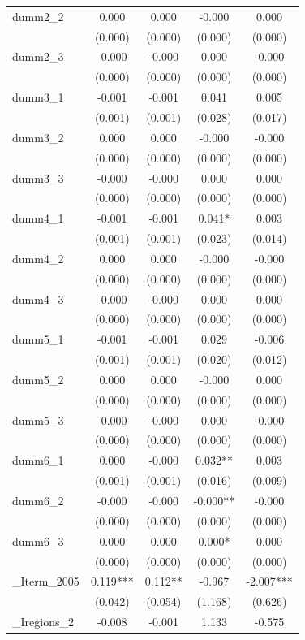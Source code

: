 \documentclass[]{article}
\begin{document}
\begin{tabular}{lcccc}
dumm2\_2 & 0.000 & 0.000 & -0.000 & 0.000 \\
 & (0.000) & (0.000) & (0.000) & (0.000) \\
dumm2\_3 & -0.000 & -0.000 & 0.000 & -0.000 \\
 & (0.000) & (0.000) & (0.000) & (0.000) \\
dumm3\_1 & -0.001 & -0.001 & 0.041 & 0.005 \\
 & (0.001) & (0.001) & (0.028) & (0.017) \\
dumm3\_2 & 0.000 & 0.000 & -0.000 & -0.000 \\
 & (0.000) & (0.000) & (0.000) & (0.000) \\
dumm3\_3 & -0.000 & -0.000 & 0.000 & 0.000 \\
 & (0.000) & (0.000) & (0.000) & (0.000) \\
dumm4\_1 & -0.001 & -0.001 & 0.041* & 0.003 \\
 & (0.001) & (0.001) & (0.023) & (0.014) \\
dumm4\_2 & 0.000 & 0.000 & -0.000 & -0.000 \\
 & (0.000) & (0.000) & (0.000) & (0.000) \\
dumm4\_3 & -0.000 & -0.000 & 0.000 & 0.000 \\
 & (0.000) & (0.000) & (0.000) & (0.000) \\
dumm5\_1 & -0.001 & -0.001 & 0.029 & -0.006 \\
 & (0.001) & (0.001) & (0.020) & (0.012) \\
dumm5\_2 & 0.000 & 0.000 & -0.000 & 0.000 \\
 & (0.000) & (0.000) & (0.000) & (0.000) \\
dumm5\_3 & -0.000 & -0.000 & 0.000 & -0.000 \\
 & (0.000) & (0.000) & (0.000) & (0.000) \\
dumm6\_1 & 0.000 & -0.000 & 0.032** & 0.003 \\
 & (0.001) & (0.001) & (0.016) & (0.009) \\
dumm6\_2 & -0.000 & -0.000 & -0.000** & -0.000 \\
 & (0.000) & (0.000) & (0.000) & (0.000) \\
dumm6\_3 & 0.000 & 0.000 & 0.000* & 0.000 \\
 & (0.000) & (0.000) & (0.000) & (0.000) \\
\_Iterm\_2005 & 0.119*** & 0.112** & -0.967 & -2.007*** \\
 & (0.042) & (0.054) & (1.168) & (0.626) \\
\_Iregions\_2 & -0.008 & -0.001 & 1.133 & -0.575 \\

\end{tabular}
\end{document}
